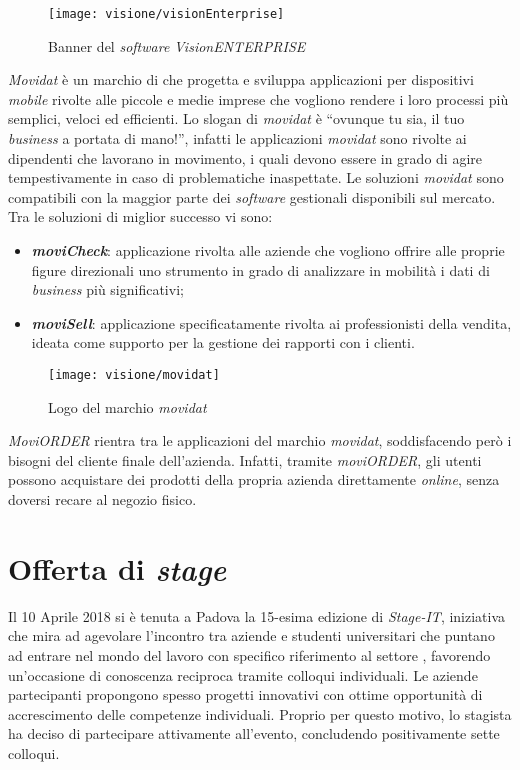 \begin{figure}[!h] 
    \centering 
    \texttt{[image: visione/visionEnterprise]} 
    \caption{Banner del \textit{software} \textit{VisionENTERPRISE}}
\end{figure}

\textit{Movidat} è un marchio di \visione{} che progetta e sviluppa applicazioni per dispositivi \textit{mobile} rivolte alle piccole e medie imprese che vogliono rendere i loro processi più semplici, veloci ed efficienti. Lo slogan di \textit{movidat} è ``ovunque tu sia, il tuo \textit{business} a portata di mano!'', infatti le applicazioni \textit{movidat} sono rivolte ai dipendenti che lavorano in movimento, i quali devono essere in grado di agire tempestivamente in caso di problematiche inaspettate. Le soluzioni \textit{movidat} sono compatibili con la maggior parte dei \textit{software} gestionali disponibili sul mercato. Tra le soluzioni di miglior successo vi sono:
\begin{itemize}
	\item \textbf{\textit{moviCheck}}: applicazione rivolta alle aziende che vogliono offrire alle proprie figure direzionali uno strumento in grado di analizzare in mobilità i dati di \textit{business} più significativi;
	\item \textbf{\textit{moviSell}}: applicazione specificatamente rivolta ai professionisti della vendita, ideata come supporto per la gestione dei rapporti con i clienti.
\end{itemize}

\begin{figure}[!h] 
    \centering 
    \texttt{[image: visione/movidat]} 
    \caption{Logo del marchio \textit{movidat}}
\end{figure}

\textit{MoviORDER} rientra tra le applicazioni del marchio \textit{movidat}, soddisfacendo però i bisogni del cliente finale dell'azienda. Infatti, tramite \textit{moviORDER}, gli utenti possono acquistare dei prodotti della propria azienda direttamente \textit{online}, senza doversi recare al negozio fisico.

\section{Offerta di \textit{stage}}

Il 10 Aprile 2018 si è tenuta a Padova la 15-esima edizione di \textit{Stage-IT}, iniziativa che mira ad agevolare l'incontro tra aziende e studenti universitari che puntano ad entrare nel mondo del lavoro con specifico riferimento al settore , favorendo un'occasione di conoscenza reciproca tramite colloqui individuali. Le aziende partecipanti propongono spesso progetti innovativi con ottime opportunità di accrescimento delle competenze individuali. Proprio per questo motivo, lo stagista ha deciso di partecipare attivamente all'evento, concludendo positivamente sette colloqui. 

